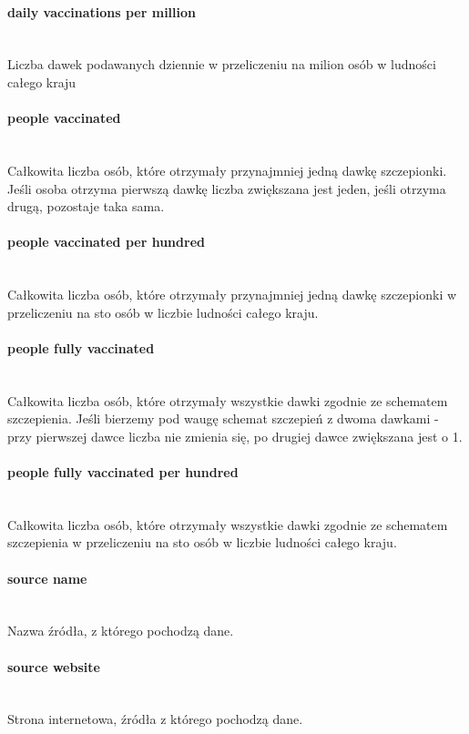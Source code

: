 \documentclass[12pt, oneside]{article}
\begin{document}
\paragraph{daily vaccinations per million}
\mbox{}\\
Liczba dawek podawanych dziennie w przeliczeniu na milion osób w ludności całego kraju

\paragraph{people vaccinated}
\mbox{}\\
Całkowita liczba osób, które otrzymały przynajmniej jedną dawkę szczepionki. Jeśli osoba otrzyma pierwszą dawkę liczba zwiększana jest jeden, jeśli otrzyma drugą, pozostaje taka sama. 

\paragraph{people vaccinated per hundred}
\mbox{}\\
Całkowita liczba osób, które otrzymały przynajmniej jedną dawkę szczepionki w przeliczeniu na sto osób w liczbie ludności całego kraju.

\paragraph{people fully vaccinated}
\mbox{}\\
Całkowita liczba osób, które otrzymały wszystkie dawki zgodnie ze schematem szczepienia. Jeśli bierzemy pod waugę schemat szczepień z dwoma dawkami - przy pierwszej dawce liczba nie zmienia się, po drugiej dawce zwiększana jest o 1. 

\paragraph{people fully vaccinated per hundred}
\mbox{}\\
Całkowita liczba osób, które otrzymały wszystkie dawki zgodnie ze schematem szczepienia w przeliczeniu na sto osób w liczbie ludności całego kraju.

\paragraph{source name}
\mbox{}\\
Nazwa źródła, z którego pochodzą dane.

\paragraph{source website}
\mbox{}\\
Strona internetowa, źródła z którego pochodzą dane. 
\end{document}
